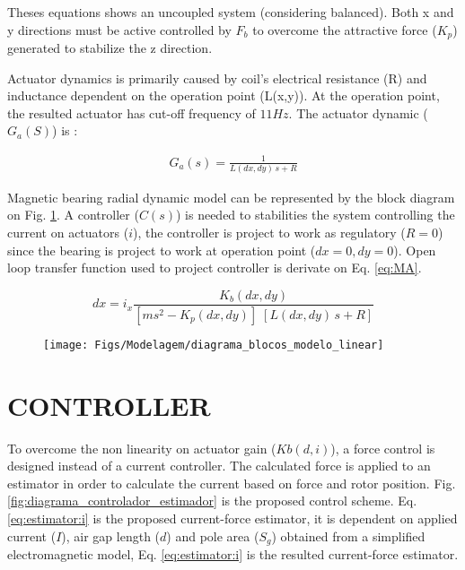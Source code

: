 \documentclass[10pt,fleqn,a4paper,twoside]{article}
\begin{document}
	Theses equations shows an uncoupled system (considering balanced). Both x and y directions must be active controlled by $F_b$ to overcome the attractive force ($K_p$) generated to stabilize the z direction. 
		
	Actuator dynamics is primarily caused by coil's electrical resistance (R) and inductance dependent on the operation point (L(x,y)). At the operation point, the resulted actuator has cut-off frequency of $11Hz$. The actuator dynamic ($G_a(S)$) is :
	
	\begin{align}
		G_a(s) = \frac{1}{L(dx,dy) \, s + R} 
	\end{align}
	
	Magnetic bearing radial dynamic model can be represented by the block diagram on Fig. \ref{fig:diagrama_blocos_modelo_linear}. A controller ($C(s)$) is needed to stabilities the system controlling the current on actuators ($i$), the controller is project to work as regulatory ($R=0$) since the bearing is project to work at  operation point ($dx=0, dy=0$).	Open loop transfer function used to project controller is derivate on Eq. \ref{eq:MA}.
	
	\begin{equation}
	dx = i_x \frac{K_b(dx,dy)}{[m s^2 - K_p (dx,dy)] \; [L(dx,dy) \, s + R] } 
	\label{eq:MA}
	\end{equation}
	
	\begin{figure}[!ht]
	\centering
	\texttt{[image: Figs/Modelagem/diagrama\_blocos\_modelo\_linear]}
	\label{fig:diagrama_blocos_modelo_linear}
	\end{figure}	
	

	
	\section{\uppercase{CONTROLLER}}
	
	To overcome the non linearity on actuator gain ($Kb(d,i)$), a force control is designed instead of a current controller. The calculated force is applied to an estimator in order to calculate the current based on force and rotor position. Fig. \ref{fig:diagrama_controlador_estimador} is the proposed control scheme. Eq. \ref{eq:estimator:i} is the proposed current-force estimator, it is dependent on applied current ($I$), air gap length ($d$) and pole area  ($S_g$) obtained from a simplified electromagnetic model, Eq. \ref{eq:estimator:i} is the resulted current-force estimator.
		
\end{document}
